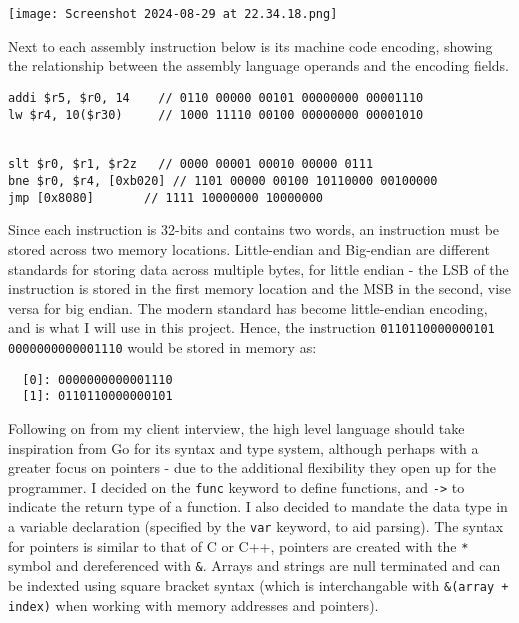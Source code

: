 \bigskip

\begin{center}
\texttt{[image: Screenshot 2024-08-29 at 22.34.18.png]}
\end{center}

\bigskip

Next to each assembly instruction below is its machine code encoding, showing the relationship between the assembly language operands and the encoding fields. 

\begin{lstlisting}
addi $r5, $r0, 14    // 0110 00000 00101 00000000 00001110
lw $r4, 10($r30)     // 1000 11110 00100 00000000 00001010


slt $r0, $r1, $r2z   // 0000 00001 00010 00000 0111 
bne $r0, $r4, [0xb020] // 1101 00000 00100 10110000 00100000
jmp [0x8080]       // 1111 10000000 10000000
\end{lstlisting}

Since each instruction is 32-bits and contains two words, an instruction must be stored across two memory locations. Little-endian and Big-endian are different standards for storing data across multiple bytes, for little endian - the LSB of the instruction is stored in the first memory location and the MSB in the second, vise versa for big endian. The modern standard has become little-endian encoding, and is what I will use in this project. Hence, the instruction \texttt{0110110000000101 0000000000001110} would be stored in memory as:

\begin{lstlisting}
  [0]: 0000000000001110
  [1]: 0110110000000101 
\end{lstlisting}

Following on from my client interview, the high level language should take inspiration from Go for its syntax and type system, although perhaps with a greater focus on pointers - due to the additional flexibility they open up for the programmer. I decided on the \texttt{func} keyword to define functions, and \texttt{->} to indicate the return type of a function. I also decided to mandate the data type in a variable declaration (specified by the \texttt{var} keyword, to aid parsing). The syntax for pointers is similar to that of C or C++, pointers are created with the \texttt{*} symbol and dereferenced with \texttt{\&}. Arrays and strings are null terminated and can be indexted using square bracket syntax (which is interchangable with \texttt{\&(array + index)} when working with memory addresses and pointers).

